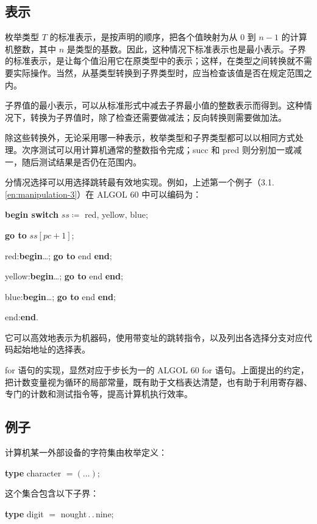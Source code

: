 \subsection{表示}

枚举类型 $T$ 的标准表示，是按声明的顺序，把各个值映射为从 0 到 $n - 1$ 的计算机整数，其中 $n$ 是类型的基数。因此，这种情况下标准表示也是最小表示。子界的标准表示，是让每个值沿用它在原类型中的表示；这样，在类型之间转换就不需要实际操作。当然，从基类型转换到子界类型时，应当检查该值是否在规定范围之内。

子界值的最小表示，可以从标准形式中减去子界最小值的整数表示而得到。这种情况下，转换为子界值时，除了检查还需要做减法；反向转换则需要做加法。

除这些转换外，无论采用哪一种表示，枚举类型和子界类型都可以以相同方式处理。次序测试可以用计算机通常的整数指令完成；succ 和 pred 则分别加一或减一，随后测试结果是否仍在范围内。

分情况选择可以用选择跳转最有效地实现。例如，上述第一个例子（3.1.\ref{en:manipulation-3}）在 ALGOL 60 中可以编码为：

\quad \textbf{begin switch} $ss \coloneq$ red, yellow, blue;

\quad \quad \textbf{go to} $ss[pc + 1]$;

\quad \quad red:\textbf{begin}\dots; \textbf{go to} end \textbf{end};

\quad \quad yellow:\textbf{begin}\dots; \textbf{go to} end \textbf{end};

\quad \quad blue:\textbf{begin}\dots; \textbf{go to} end \textbf{end};

\quad end:\textbf{end}. 

它可以高效地表示为机器码，使用带变址的跳转指令，以及列出各选择分支对应代码起始地址的选择表。

for 语句的实现，显然对应于步长为一的 ALGOL 60 for 语句。上面提出的约定，把计数变量视为循环的局部常量，既有助于文档表达清楚，也有助于利用寄存器、专门的计数和测试指令等，提高计算机执行效率。

\subsection{例子}
\label{sec:example-3-3}

计算机某一外部设备的字符集由枚举定义：

\quad \textbf{type} character $= (\dots)$;

\noindent
这个集合包含以下子界：

\quad \textbf{type} digit $=$ nought\,.\,.\,nine;

